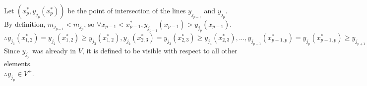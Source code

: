 \documentclass{article}
\begin{document}

Let $(x^*_p, y_{j_p}(x^*_p))$ be the point of intersection of the lines $y_{j_{p-1}}$ and $y_{j_{p}}$.\\
By definition, $m_{j_{p-1}} < m_{j_{p}}$, so $\forall x_{p-1} < x^*_{p-1}, y_{j_{p-1}} (x_{p-1}) > y_{j_{p}} (x_{p-1})$.\\
$\therefore y_{j_{1}}(x^*_{1,2}) = y_{j_{2}}(x^*_{1,2}) \geq y_{j_3}(x^*_{1,2}), y_{j_{2}}(x^*_{2,3}) = y_{j_{3}}(x^*_{2,3}) \geq y_{j_4}(x^*_{2,3}), ..., y_{j_{p-1}}(x^*_{p-1,p}) = y_{j_{p}}(x^*_{p-1,p}) \geq y_{j_{p+1}}(x^*_{p-1,p}), ..., y_{j_{k-1}}(x^*_{k-1,k}) = y_{j_{k}}(x^*_{k-1,k}) \geq y_{j_{i}}(x^*_{k-1,k})$\\
Since $y_{j_p}$ was already in $V$, it is defined to be visible with respect to all other elements.\\
$\therefore y_{j_p} \in V^+$.
\end{document}
